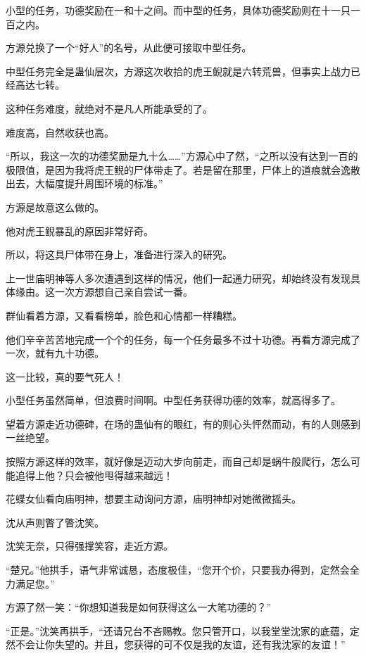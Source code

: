 
\begin{this_body}

小型的任务，功德奖励在一和十之间。而中型的任务，具体功德奖励则在十一只一百之内。

方源兑换了一个“好人”的名号，从此便可接取中型任务。

中型任务完全是蛊仙层次，方源这次收拾的虎王鲵就是六转荒兽，但事实上战力已经高达七转。

这种任务难度，就绝对不是凡人所能承受的了。

难度高，自然收获也高。

“所以，我这一次的功德奖励是九十么……”方源心中了然，“之所以没有达到一百的极限值，是因为我将虎王鲵的尸体带走了。若是留在那里，尸体上的道痕就会逸散出去，大幅度提升周围环境的标准。”

方源是故意这么做的。

他对虎王鲵暴乱的原因非常好奇。

所以，将这具尸体带在身上，准备进行深入的研究。

上一世庙明神等人多次遭遇到这样的情况，他们一起通力研究，却始终没有发现具体缘由。这一次方源想自己亲自尝试一番。

群仙看着方源，又看看榜单，脸色和心情都一样糟糕。

他们辛辛苦苦地完成一个个的任务，每一个任务最多不过十功德。再看方源完成了一次，就有九十功德。

这一比较，真的要气死人！

小型任务虽然简单，但浪费时间啊。中型任务获得功德的效率，就高得多了。

望着方源走近功德碑，在场的蛊仙有的眼红，有的则心头怦然而动，有的人则感到一丝绝望。

按照方源这样的效率，就好像是迈动大步向前走，而自己却是蜗牛般爬行，怎么可能追得上他？只会被他甩得越来越远！

花蝶女仙看向庙明神，想要主动询问方源，庙明神却对她微微摇头。

沈从声则瞥了瞥沈笑。

沈笑无奈，只得强撑笑容，走近方源。

“楚兄。”他拱手，语气非常诚恳，态度极佳，“您开个价，只要我办得到，定然会全力满足您。”

方源了然一笑：“你想知道我是如何获得这么一大笔功德的？”

“正是。”沈笑再拱手，“还请兄台不吝赐教。您只管开口，以我堂堂沈家的底蕴，定然不会让你失望的。并且，您获得的可不仅是我的友谊，还有我沈家的友谊！”


\end{this_body}
